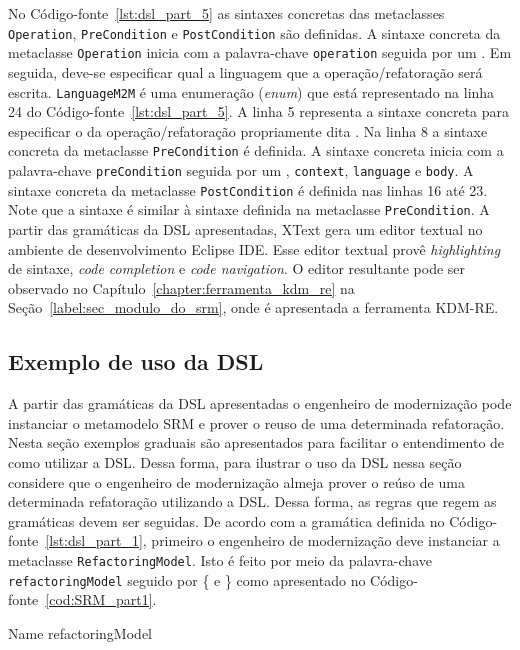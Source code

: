 No Código-fonte~\ref{lst:dsl_part_5} as sintaxes concretas das metaclasses \texttt{Operation}, \texttt{PreCondition} e \texttt{PostCondition} são definidas. A sintaxe concreta da metaclasse \texttt{Operation} inicia com a palavra-chave \texttt{operation} seguida por um \aspas{\{}. Em seguida, deve-se especificar qual a linguagem que a operação/refatoração será escrita. \texttt{LanguageM2M} é uma enumeração (\textit{enum}) que está representado na linha 24 do Código-fonte~\ref{lst:dsl_part_5}. A linha 5 representa a sintaxe concreta para especificar o  da operação/refatoração propriamente dita . Na linha 8 a sintaxe concreta da metaclasse \texttt{PreCondition} é definida. A sintaxe concreta inicia com a palavra-chave \texttt{preCondition} seguida por um \aspas{\{}, \texttt{context}, \texttt{language} e \texttt{body}. A sintaxe concreta da metaclasse \texttt{PostCondition} é definida nas linhas 16 até 23. Note que a sintaxe é similar à sintaxe definida na metaclasse \texttt{PreCondition}. A partir das gramáticas da DSL apresentadas, XText gera um editor textual no ambiente de desenvolvimento Eclipse IDE. Esse editor textual provê \textit{highlighting} de sintaxe, \textit{code completion} e \textit{code navigation}. O editor resultante pode ser observado no Capítulo~\ref{chapter:ferramenta_kdm_re} na Seção~\ref{label:sec_modulo_do_srm}, onde é apresentada a ferramenta KDM-RE.

\subsection{Exemplo de uso da DSL}

A partir das gramáticas da DSL apresentadas o engenheiro de modernização pode instanciar o metamodelo SRM e prover o reuso de uma determinada refatoração. Nesta seção exemplos graduais são apresentados para facilitar o entendimento de como utilizar a DSL. Dessa forma, para ilustrar o uso da DSL nessa seção considere que o engenheiro de modernização almeja prover o reúso de uma determinada refatoração utilizando a DSL. Dessa forma, as regras que regem as gramáticas devem ser seguidas. De acordo com a gramática definida no Código-fonte~\ref{lst:dsl_part_1}, primeiro o engenheiro de modernização deve instanciar a metaclasse \texttt{RefactoringModel}. Isto é feito por meio da palavra-chave \texttt{refactoringModel} seguido por \{ e \} como apresentado no Código-fonte~\ref{cod:SRM_part1}.

\begin{codigo}[caption={[Exemplo de uso da DSL - parte 1.] Exemplo de uso da DSL - parte 1.},escapeinside={(*@}{@*)}, basicstyle=\footnotesize, label={cod:SRM_part1}, language=myDSL]{Name}
refactoringModel {

}
\end{codigo}

